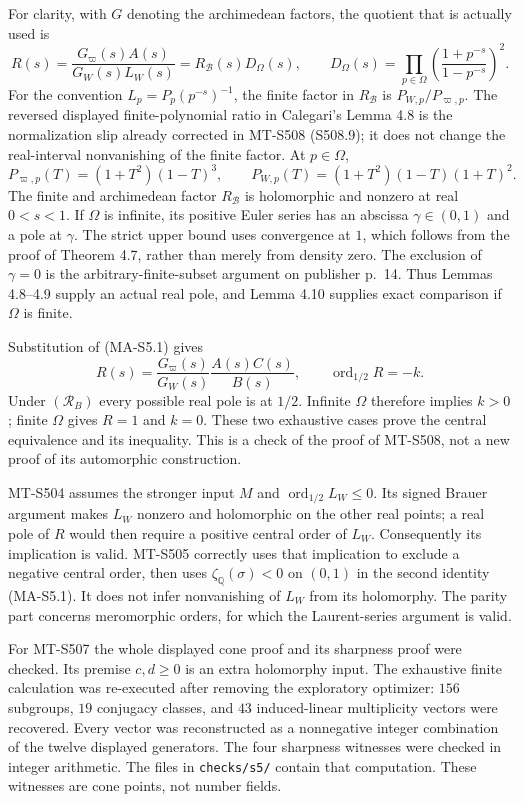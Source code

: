 For clarity, with $G$ denoting the archimedean factors, the quotient
that is actually used is
\[
 R(s)=\frac{G_{\varpi}(s)A(s)}{G_W(s)L_W(s)}
     =R_{\mathcal B}(s)D_\Omega(s),\qquad
 D_\Omega(s)=\prod_{p\in\Omega}
       \left(\frac{1+p^{-s}}{1-p^{-s}}\right)^2.
 \tag{MA-S5.3}
\]
For the convention $L_p=P_p(p^{-s})^{-1}$, the finite factor in
$R_{\mathcal B}$ is $P_{W,p}/P_{\varpi,p}$. The reversed displayed
finite-polynomial ratio in Calegari's Lemma 4.8 is the normalization
slip already corrected in MT-S508 (S508.9); it does not change the
real-interval nonvanishing of the finite factor. At $p\in\Omega$,
\[
 P_{\varpi,p}(T)=(1+T^2)(1-T)^3,\qquad
 P_{W,p}(T)=(1+T^2)(1-T)(1+T)^2.
\]
The finite and archimedean factor $R_{\mathcal B}$ is holomorphic
and nonzero at real $0<s<1$. If $\Omega$ is infinite, its positive
Euler series has an abscissa $\gamma\in(0,1)$ and a pole at
$\gamma$. The strict upper bound uses convergence at $1$, which
follows from the proof of Theorem 4.7, rather than merely from
density zero. The exclusion of $\gamma=0$ is the arbitrary-finite-subset
argument on publisher p.~14. Thus Lemmas 4.8--4.9 supply an actual
real pole, and Lemma 4.10 supplies exact comparison if $\Omega$
is finite.

Substitution of (MA-S5.1) gives
\[
 R(s)=\frac{G_{\varpi}(s)}{G_W(s)}\frac{A(s)C(s)}{B(s)},
 \qquad \operatorname{ord}_{1/2}R=-k.
\]
Under $(\mathcal R_B)$ every possible real pole is at $1/2$.
Infinite $\Omega$ therefore implies $k>0$; finite $\Omega$ gives
$R=1$ and $k=0$. These two exhaustive cases prove the central
equivalence and its inequality. This is a check of the proof of
MT-S508, not a new proof of its automorphic construction.

MT-S504 assumes the stronger input $M$ and $\operatorname{ord}_{1/2}L_W\le0$.
Its signed Brauer argument makes $L_W$ nonzero and holomorphic on
the other real points; a real pole of $R$ would then require a
positive central order of $L_W$. Consequently its implication is
valid. MT-S505 correctly uses that implication to exclude a negative
central order, then uses $\zeta_{\mathbb Q}(\sigma)<0$ on $(0,1)$
in the second identity (MA-S5.1). It does not infer nonvanishing
of $L_W$ from its holomorphy. The parity part concerns meromorphic
orders, for which the Laurent-series argument is valid.

For MT-S507 the whole displayed cone proof and its sharpness proof
were checked. Its premise $c,d\ge0$ is an extra holomorphy input.
The exhaustive finite calculation was re-executed after removing
the exploratory optimizer: $156$ subgroups, $19$ conjugacy classes,
and $43$ induced-linear multiplicity vectors were recovered. Every
vector was reconstructed as a nonnegative integer combination of
the twelve displayed generators. The four sharpness witnesses
were checked in integer arithmetic. The files in
\texttt{checks/s5/} contain that computation. These witnesses are
cone points, not number fields.

